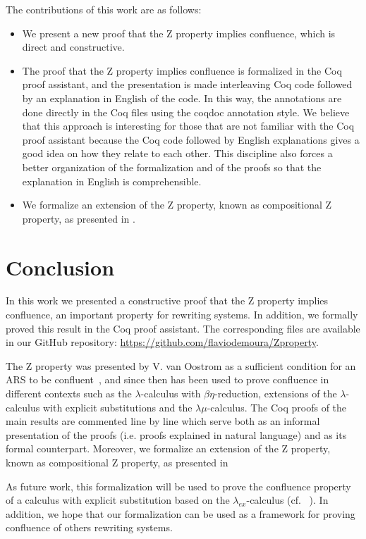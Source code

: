 \documentclass{llncs}
\begin{document}
The contributions of this work are as follows:
\begin{itemize}
\item We present a new proof that the Z property implies confluence, which is direct and constructive.
\item The proof that the Z property implies confluence is formalized in the Coq proof assistant, and the presentation is made interleaving Coq code followed by an explanation in English of the code. In this way, the annotations are done directly in the Coq files using the coqdoc annotation style. We believe that this approach is interesting for those that are not familiar with the Coq proof assistant because the Coq code followed by English explanations gives a good idea on how they relate to each other. This discipline also forces a better organization of the formalization and of the proofs so that the explanation in English is comprehensible.
\item We formalize an extension of the Z property, known as compositional Z property, as presented in \cite{Nakazawa-Fujita2016}.
\end{itemize}




\section{Conclusion}

In this work we presented a constructive proof that the Z property
implies confluence, an important property for rewriting systems. In
addition, we formally proved this result in the Coq proof
assistant. The corresponding files are available in our GitHub
repository: \url{https://github.com/flaviodemoura/Zproperty}.

The Z property was presented by V. van Oostrom as a sufficient
condition for an ARS to be confluent~\cite{zproperty}, and since
then has been used to prove confluence in different contexts such as
the $\lambda$-calculus with $\beta\eta$-reduction, extensions of the
$\lambda$-calculus with explicit substitutions and the
$\lambda\mu$-calculus. The Coq proofs of the main results are
commented line by line which serve both as an informal presentation of
the proofs (i.e. proofs explained in natural language) and as its
formal counterpart. Moreover, we formalize an extension of the Z
property, known as compositional Z property, as presented in
\cite{Nakazawa-Fujita2016}

As future work, this formalization will be used to prove the
confluence property of a calculus with explicit substitution based on
the $\lambda_{ex}$-calculus (cf. ~\cite{kes09}). In addition, we hope
that our formalization can be used as a framework for proving
confluence of others rewriting systems.



\end{document}
